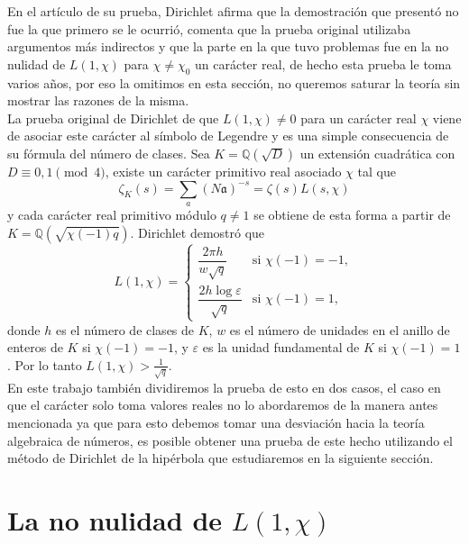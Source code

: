En el artículo de su prueba, Dirichlet afirma que la demostración que presentó no fue  la que primero se le ocurrió, comenta que la prueba original utilizaba argumentos más indirectos y que la parte en la que tuvo problemas fue en la no nulidad de $L(1,\chi)$ para $\chi\neq \chi_0$ un carácter real, de hecho esta prueba le toma varios años, por eso la omitimos en esta sección, no queremos saturar la teoría sin mostrar las razones de la misma.\\

La prueba original de Dirichlet de que \(L(1, \chi) \neq 0\) para un carácter real \(\chi\) viene de asociar este carácter al símbolo de Legendre y es una simple consecuencia de su fórmula del número de clases. Sea \(K = \mathbb{Q}(\sqrt{D})\) un extensión cuadrática con \(D \equiv 0, 1 \pmod{4}\), existe un carácter primitivo real asociado \(\chi\) tal que
\[
\zeta_K(s) = \sum_a (N\mathfrak{a})^{-s} = \zeta(s)L(s, \chi)
\]
y cada carácter real primitivo módulo \( q \neq 1 \) se obtiene de esta forma a partir de \( K = \mathbb{Q}(\sqrt{\chi(-1)q}) \). Dirichlet demostró que
\[
L(1, \chi) = 
\begin{cases}
\dfrac{2\pi h}{w \sqrt{q}} & \text{si } \chi(-1) = -1, \\[8pt]
\dfrac{2h \log \varepsilon}{\sqrt{q}} & \text{si } \chi(-1) = 1,
\end{cases}
\]
donde \(h\) es el número de clases de \(K\), \(w\) es el número de unidades en el anillo de enteros de \(K\) si \(\chi(-1) = -1\), y \(\varepsilon\) es la unidad fundamental de \(K\) si \(\chi(-1) = 1\). Por lo tanto $L(1, \chi) > \frac{1}{\sqrt{q}}$. \cite{iwaniec2021analytic}\\

En este trabajo también dividiremos la prueba de esto en dos casos, el caso en que el carácter solo toma valores reales no lo abordaremos de la manera antes mencionada ya que para esto debemos tomar una desviación hacia la teoría algebraica de números, es posible obtener una prueba de este hecho utilizando el método de Dirichlet de la hipérbola que estudiaremos en la siguiente sección.


\section{La no nulidad de \texorpdfstring{$L(1,\chi)$}{Lg}}
